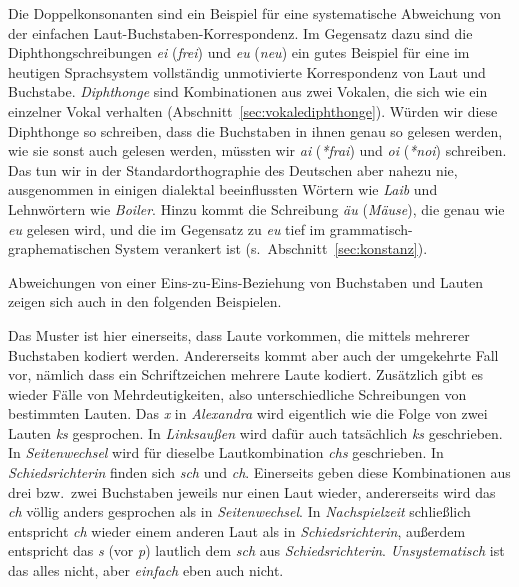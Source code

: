 Die Doppelkonsonanten sind ein Beispiel für eine systematische Abweichung von der einfachen Laut-Buchstaben-Korrespondenz.
Im Gegensatz dazu sind die Diphthongschreibungen \textit{ei} (\textit{frei}) und \textit{eu} (\textit{neu}) ein gutes Beispiel für eine im heutigen Sprachsystem vollständig unmotivierte Korrespondenz von Laut und Buchstabe.
\textit{Diphthonge} sind Kombinationen aus zwei Vokalen, die sich wie ein einzelner Vokal verhalten (Abschnitt~\ref{sec:vokalediphthonge}).
Würden wir diese Diphthonge so schreiben, dass die Buchstaben in ihnen genau so gelesen werden, wie sie sonst auch gelesen werden, müssten wir \textit{ai} (\textit{*frai}) und \textit{oi} (\textit{*noi}) schreiben.
Das tun wir in der Standardorthographie des Deutschen aber nahezu nie, ausgenommen in einigen dialektal beeinflussten Wörtern wie \textit{Laib} und Lehnwörtern wie \textit{Boiler}.
Hinzu kommt die Schreibung \textit{äu} (\textit{Mäuse}), die genau wie \textit{eu} gelesen wird, und die im Gegensatz zu \textit{eu} tief im grammatisch-graphematischen System verankert ist (s.\ Abschnitt~\ref{sec:konstanz}).

Abweichungen von einer Eins-zu-Eins-Beziehung von Buchstaben und Lauten zeigen sich auch in den folgenden Beispielen.

\begin{exe}
  \ex
  \begin{xlist}
  \end{xlist}
\end{exe}

Das Muster ist hier einerseits, dass Laute vorkommen, die mittels mehrerer Buchstaben kodiert werden.
Andererseits kommt aber auch der umgekehrte Fall vor, nämlich dass ein Schriftzeichen mehrere Laute kodiert.
Zusätzlich gibt es wieder Fälle von Mehrdeutigkeiten, also unterschiedliche Schreibungen von bestimmten Lauten.
Das \textit{x} in \textit{Alexandra} wird eigentlich wie die Folge von zwei Lauten \textit{ks} gesprochen.
In \textit{Linksaußen} wird dafür auch tatsächlich \textit{ks} geschrieben.
In \textit{Seitenwechsel} wird für dieselbe Lautkombination \textit{chs} geschrieben.
In \textit{Schiedsrichterin} finden sich \textit{sch} und \textit{ch}.
Einerseits geben diese Kombinationen aus drei bzw.\ zwei Buchstaben jeweils nur einen Laut wieder, andererseits wird das \textit{ch} völlig anders gesprochen als in \textit{Seitenwechsel}.
In \textit{Nachspielzeit} schließlich entspricht \textit{ch} wieder einem anderen Laut als in \textit{Schiedsrichterin}, außerdem entspricht das \textit{s} (vor \textit{p}) lautlich dem \textit{sch} aus \textit{Schiedsrichterin}.
\textit{Unsystematisch} ist das alles nicht, aber \textit{einfach} eben auch nicht.

